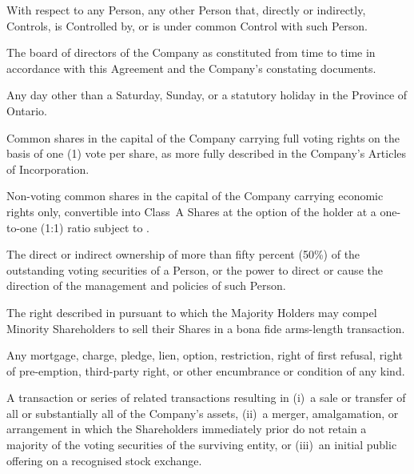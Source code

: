 \begin{description}[
  labelwidth = 3.5cm,
  leftmargin = 3.8cm,
  labelsep   = 0.3cm,
  font       = \bfseries\color{NavyDeep},
  itemsep    = 6pt
]
  \item[Affiliate]
    With respect to any Person, any other Person that, directly or indirectly,
    Controls, is Controlled by, or is under common Control with such Person.

  \item[Board]
    The board of directors of the Company as constituted from time to time in
    accordance with this Agreement and the Company's constating documents.

  \item[Business Day]
    Any day other than a Saturday, Sunday, or a statutory holiday in the Province
    of Ontario.

  \item[Class A Shares]
    Common shares in the capital of the Company carrying full voting rights on the
    basis of one (1) vote per share, as more fully described in the Company's
    Articles of Incorporation.

  \item[Class B Shares]
    Non-voting common shares in the capital of the Company carrying economic rights
    only, convertible into Class~A Shares at the option of the holder at a one-to-one
    (1:1) ratio subject to .

  \item[Control]
    The direct or indirect ownership of more than fifty percent (50\%) of the
    outstanding voting securities of a Person, or the power to direct or cause the
    direction of the management and policies of such Person.

  \item[Drag-Along Right]
    The right described in  pursuant to which the Majority Holders may
    compel Minority Shareholders to sell their Shares in a bona fide arms-length
    transaction.

  \item[Encumbrance]
    Any mortgage, charge, pledge, lien, option, restriction, right of first refusal,
    right of pre-emption, third-party right, or other encumbrance or condition
    of any kind.

  \item[Exit Event]
    A transaction or series of related transactions resulting in (i)~a sale or
    transfer of all or substantially all of the Company's assets, (ii)~a merger,
    amalgamation, or arrangement in which the Shareholders immediately prior do not
    retain a majority of the voting securities of the surviving entity, or
    (iii)~an initial public offering on a recognised stock exchange.


\end{description}
